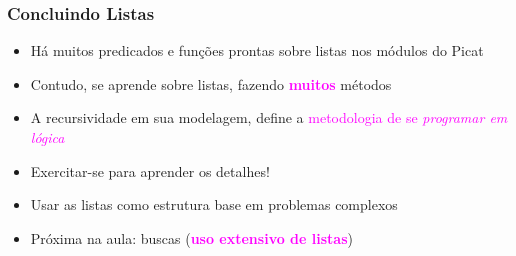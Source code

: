 \begin{frame}[fragile]
\frametitle{Concluindo Listas}

\begin{block}{}
\begin{itemize}
  \item Há muitos predicados e funções prontas sobre listas nos módulos do Picat
  \pause
  \item Contudo, se aprende sobre listas, fazendo \textcolor{magenta}{\textbf{muitos}} métodos
    \pause
  \item A recursividade em sua modelagem, define a \textcolor{magenta}{metodologia de se \textit{programar em lógica}}
    \pause
  \item Exercitar-se para aprender os detalhes!
    \pause
  \item Usar as listas como estrutura base em problemas complexos
  
     \pause
  \item Próxima na aula: buscas (\textcolor{magenta}{\textbf{uso extensivo de listas}})
  
\end{itemize}

\end{block}

\end{frame}

